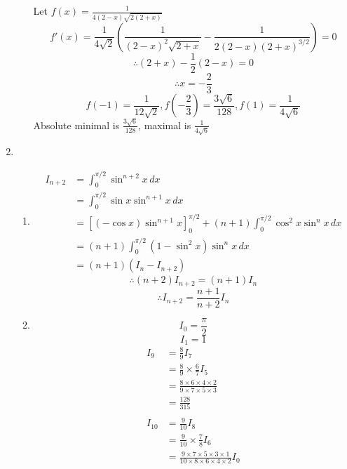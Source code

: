\documentclass[12pt]{article}
\theoremstyle{definition}
\begin{document}
\begin{enumerate}
\begin{enumerate}
                Let $f(x) = \frac{1}{4(2-x)\sqrt{2(2+x)}}$
                \[f'(x) = \frac{1}{4\sqrt{2}}\left(\frac{1}{(2-x)^2\sqrt{2+x}} - \frac{1}{2(2-x)(2+x)^{3/2}}\right) = 0\]
                \[\therefore (2+x)-\frac{1}{2}(2-x) = 0\]
                \[\therefore x = -\frac{2}{3}\]
                \[f(-1)=\frac{1}{12\sqrt{2}}, f\left(-\frac{2}{3}\right)=\frac{3\sqrt{6}}{128}, f(1)=\frac{1}{4\sqrt{6}}\]
                Absolute minimal is $\frac{3\sqrt{6}}{128}$, maximal is $\frac{1}{4\sqrt{6}}$
        \end{enumerate}
        \item 
              \begin{enumerate}
                \item \begin{align*}
                        I_{n+2} &= \int_0^{\pi/2}\sin^{n+2} x\,dx \\
                                &= \int_0^{\pi/2}\sin x\sin^{n+1} x\,dx \\
                                &= \left[(-\cos x)\sin^{n+1} x\right]_0^{\pi/2} + (n+1)\int_0^{\pi/2}\cos^2 x\sin^{n} x\,dx \\
                                &= (n+1)\int_0^{\pi/2}(1-\sin^2 x)\sin^{n} x\,dx \\
                                &= (n+1)(I_n - I_{n+2})
                      \end{align*}
                      \[\therefore (n+2)I_{n+2} = (n+1)I_n\]
                      \[\therefore I_{n+2} = \frac{n+1}{n+2}I_n\]
                \item \[I_0 = \frac{\pi}{2}\]
                      \[I_1 = 1\]
                      \begin{align*}
                        I_9 &= \frac{8}{9}I_7 \\
                            &= \frac{8}{9}\times \frac{6}{7} I_5 \\
                            &= \frac{8\times 6\times 4\times 2}{9\times 7\times 5\times 3} \\
                            &= \frac{128}{315}\\
                            \\
                        I_{10} &= \frac{9}{10}I_8 \\
                            &= \frac{9}{10}\times \frac{7}{8} I_6 \\
                            &= \frac{9\times 7\times 5\times 3\times 1}{10\times 8\times 6\times 4\times 2} I_0 \\

\end{align*}
\end{enumerate}
\end{enumerate}
\end{document}
